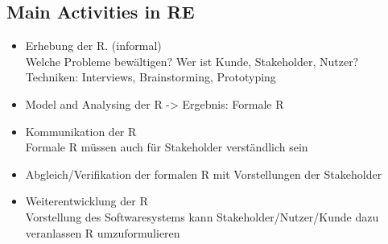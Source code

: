 \subsection{Main Activities in RE}
\begin{itemize}
	\item Erhebung der R. (informal)\\
	Welche Probleme bewältigen? Wer ist Kunde, Stakeholder, Nutzer? Techniken: Interviews, Brainstorming, Prototyping
	\item Model and Analysing der R -> Ergebnis: Formale R
	\item Kommunikation der R\\
	Formale R müssen auch für Stakeholder verständlich sein
	\item Abgleich/Verifikation der formalen R mit Vorstellungen der Stakeholder
	\item Weiterentwicklung der R \\
	Vorstellung des Softwaresystems kann Stakeholder/Nutzer/Kunde dazu veranlassen R umzuformulieren
\end{itemize}